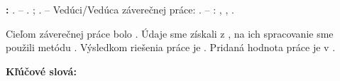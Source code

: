 {}

\vspace{7mm}
\noindent
\textbf{\MakeUppercase{\AuthorName}:} \ThesisTitleSK. -- \UniversityName.
\FacultyName; \DepartmentName. -- Vedúci/Vedúca záverečnej práce:
\SupervisorName. -- \PlaceName: \FacultyAbbrev, \SubmissionYear, \PageCount.

\vspace{6mm}
\noindent
Cieľom záverečnej práce bolo \AbstractGoalSK.
Údaje sme získali z \AbstractDataSK, na ich spracovanie sme použili metódu
\AbstractMethodSK. Výsledkom riešenia práce je \AbstractResultSK.
Pridaná hodnota práce je v \AbstractValueSK.

\vspace{4mm}
\noindent
\textbf{Kľúčové slová:} \KeywordsSK

\clearpage
